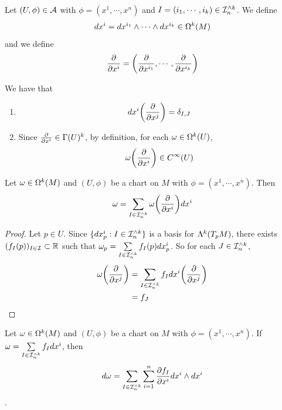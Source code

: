 \documentclass{book}
\begin{document}
	\begin{ex}
	
	\end{ex}

	\begin{defn}
		Let $(U, \phi) \in \mathcal{A}$ with $\phi = (x^1, \cdots, x^n)$ and $I = (i_1, \cdots, i_k) \in \mathcal{I}_n^{\wedge k}$. We define $$dx^i = dx^{i_1} \wedge \cdots \wedge dx^{i_k} \in \Omega^k(M)$$ 
		and we define $$\frac{\partial}{\partial x^i}= \bigg(\frac{\partial}{\partial x^{i_1}}, \cdots, \frac{\partial}{\partial x^{i_k}} \bigg)$$

	\end{defn}
	
	\begin{note} We have that
	\begin{enumerate}
	\item  $$d x^i \bigg (\frac{\partial}{\partial x^j} \bigg) = \delta_{I,J}$$
	\item Since $\frac{\partial}{\partial x^i} \in \Gamma(U)^k$, by definition, for each $\omega \in \Omega^k(U)$, $$\omega \bigg(\frac{\partial}{\partial x^i} \bigg) \in C^{\infty}(U)$$
	\end{enumerate}
	\end{note}

	\begin{ex}
		Let $\omega \in \Omega^k(M)$ and $(U, \phi)$ be a chart on $M$ with $\phi = (x^1, \cdots, x^n)$. Then $$\omega = \sum_{I \in \mathcal{I}_n^{\wedge k}}\omega \bigg(\frac{\partial}{\partial x^i} \bigg) dx^i$$
	\end{ex}

	\begin{proof}
		Let $p \in U$. Since $\{dx^i_p: I \in \mathcal{I}_n^{\wedge k}\}$ is a basis for $\Lambda^k(T_pM)$, there exists $(f_I(p))_{I \in \mathcal{I}} \subset \mathbb{R}$ such that $\omega_p = \sum\limits_{I \in \mathcal{I}_n^{\wedge k}} f_I(p) dx^i_p$. So for each $J \in \mathcal{I}_n^{\wedge k}$, 
		\begin{align*}
			\omega\bigg (\frac{\partial}{\partial x^j} \bigg ) 
			& = \sum\limits_{I \in \mathcal{I}_n^{\wedge k}} f_I dx^i \bigg (\frac{\partial}{\partial x^j} \bigg )  \\
			& = f_J
		\end{align*} 
	\end{proof}

	\begin{ex}
		Let $\omega \in \Omega^k(M)$ and $(U, \phi)$ be a chart on $M$ with $\phi = (x^1, \cdots, x^n)$. If $\omega = \sum\limits_{I \in \mathcal{I}_n^{\wedge k}}f_I dx^i$, then $$d \omega  = \sum_{I \in \mathcal{I}_n^{\wedge k}} \sum_{i =1}^n \frac{\partial f_I}{\partial x^i} dx^i \wedge dx^i$$.
	\end{ex}
\end{document}
